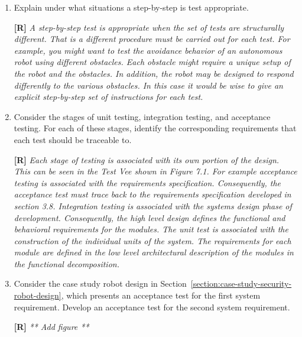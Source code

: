 \begin{enumerate}
\item
  Explain under what situations a step-by-step is test appropriate.

  \begin{onlysolution}
    \textbf{[R]}
    \itshape
    A step-by-step test is appropriate when the set of tests are structurally different. That is a different procedure 
    must be carried out for each test. For example, you might want to test the avoidance behavior of an autonomous robot 
    using different obstacles. Each obstacle might require a unique setup of the robot and the obstacles. In addition, 
    the robot may be designed to respond differently to the various obstacles. In this case it would be wise to give an 
    explicit step-by-step set of instructions for each test.
  \end{onlysolution}

\item
  Consider the stages of unit testing, integration testing, and
  acceptance testing. For each of these stages, identify the
  corresponding requirements that each test should be traceable to.

  \begin{onlysolution}
    \textbf{[R]}
    \itshape
    Each stage of testing is associated with its own portion of the design. This can be seen in the Test Vee shown in 
    Figure 7.1. For example acceptance testing is associated with the requirements specification. Consequently, the 
    acceptance test must trace back to the requirements specification developed in section 3.8. Integration testing is 
    associated with the systems design phase of development. Consequently, the high level design defines the functional 
    and behavioral requirements for the modules. The unit test is associated with the construction of the individual units 
    of the system. The requirements for each module are defined in the low level architectural description of the modules 
    in the functional decomposition.
  \end{onlysolution}

\item
  Consider the case study robot design in Section~\ref{section:case-study-security-robot-design}, 
  which presents an acceptance test for the first system requirement. Develop an
  acceptance test for the second system requirement.

  \begin{onlysolution}
    \textbf{[R]}
    \itshape
    ** Add figure **
  \end{onlysolution}


\end{enumerate}
